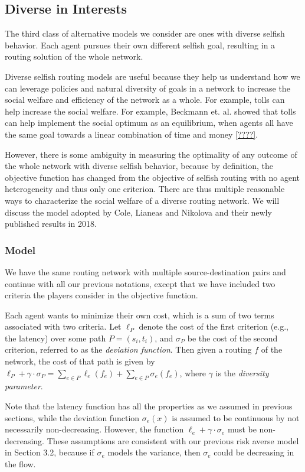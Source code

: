 \subsection{Diverse in Interests}\label{sec:diversity}

The third class of alternative models we consider are ones with diverse selfish behavior. Each agent pursues their own different selfish goal, resulting in a routing solution of the whole network. 

Diverse selfish routing models are useful because they help us understand how we can leverage policies and natural diversity of goals in a network to increase the social welfare and efficiency of the network as a whole. For example, tolls can help increase the social welfare. For example, Beckmann et. al. showed that tolls can help implement the social optimum as an equilibrium, when agents all have the same goal towards a linear combination of time and money \ref{????}.

However, there is some ambiguity in measuring the optimality of any outcome of the whole network with diverse selfish behavior, because by definition, the objective function has changed from the objective of selfish routing with no agent heterogeneity and thus only one criterion. There are thus multiple reasonable ways to characterize the social welfare of a diverse routing network. We will discuss the model adopted by Cole, Lianeas and Nikolova and their newly published results in 2018.

\subsubsection{Model}

We have the same routing network with multiple source-destination pairs and continue with all our previous notations, except that we have included two criteria the players consider in the objective function.

Each agent wants to minimize their own cost, which is a sum of two terms associated with two criteria. Let $\ell_P$ denote the cost of the first criterion (e.g., the latency) over some path $P=(s_i, t_i)$, and $\sigma_P$ be the cost of the second criterion, referred to as the {\it deviation function}. Then given a routing $f$ of the network, the cost of that path is given by $\ell_P+\gamma\cdot \sigma_P=\sum_{e\in P} \ell_e(f_e)+ \sum_{e\in P}\sigma_e(f_e)$, where $\gamma$ is the {\it diversity parameter}.

Note that the latency function has all the properties as we assumed in previous sections, while the deviation function $\sigma_e(x)$ is assumed to be continuous by not necessarily non-decreasing. However, the function $\ell_e+\gamma\cdot \sigma_e$ must be non-decreasing. These assumptions are consistent with our previous risk averse model in Section 3.2, because if $\sigma_e$ models the variance, then $\sigma_e$ could be decreasing in the flow.

